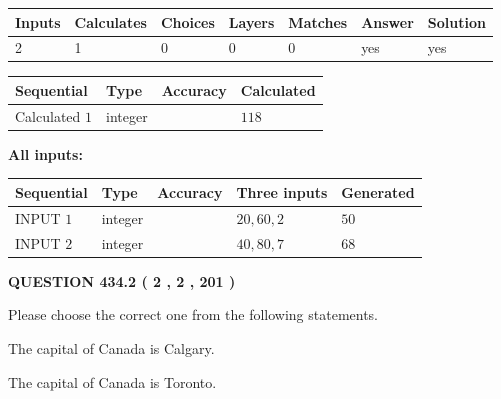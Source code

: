 \documentclass[12pt]{article}
\begin{document}
   
   
   
\noindent\begin{tabular}{|l|l|l|l|l|l|l|}
 \hline
Inputs & Calculates & Choices & Layers & Matches & Answer & Solution \\ \hline
 2  & 
 1  & 
 0
  & 
 0  & 
 0  & 
  yes & 
  yes 
  \\ \hline
 \end{tabular}
   
   
   
   
\noindent{}
   
   
  
  
\noindent\begin{tabular}{|l|l|l|l|}
\hline
 Sequential & Type & Accuracy & Calculated \\ 
\hline
 
 
  Calculated $  1 $ & integer &  & 
  $ 118 $ 
 \\  \hline  
 \end{tabular}
   
   
   
   
\noindent\vspace{0.1in}\hspace{-0.08in} {\textbf{\Large{All inputs: }}}
   
   
  
  
\noindent\begin{tabular}{|l|l|l|l|l|}
\hline
 Sequential & Type & Accuracy & Three inputs & Generated \\ 
\hline
 
 
  INPUT $  1 $ & integer &  & $
 20
 , 
 60
 , 
 2
 $ & $ 50 $ 
 \\  \hline  
 
 
  INPUT $  2 $ & integer &  & $
 40
 , 
 80
 , 
 7
 $ & $ 68 $ 
 \\  \hline  
 \end{tabular}
   
   
  
\vspace{0.2in}
  
{\textbf{\Large{QUESTION
434.2 
 ( 2 , 2 , 201 )
}}}
  
  
Please choose the correct one from the following statements.
 
 
The capital of Canada is Calgary.
 
 
The capital of Canada is Toronto.
 
\end{document}
